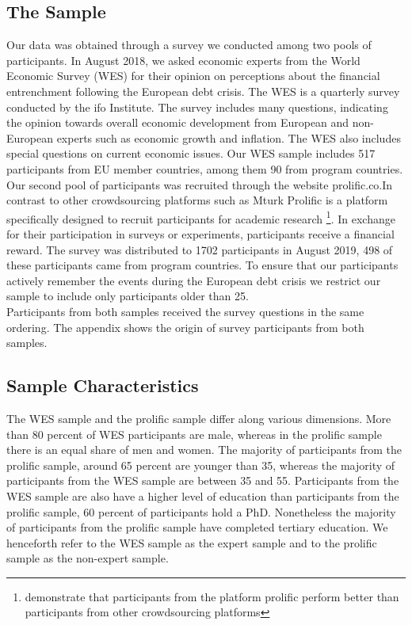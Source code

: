 \documentclass[12pt]{article}
\begin{document}
\subsection{The Sample}
Our data was obtained through a survey we conducted among two pools of participants. In August 2018, we asked economic experts from the World Economic Survey (WES) for their opinion on perceptions about the financial entrenchment following the European debt crisis. The WES is a quarterly survey conducted by the ifo Institute. The survey includes many  questions, indicating the opinion towards overall economic development from European and non-European  experts such as economic growth and inflation. The WES also includes special questions on current economic issues. Our WES sample includes 517 participants from EU member countries, among them 90 from program countries.
\\
Our second pool of participants was recruited through the website prolific.co.In contrast to other crowdsourcing platforms such as Mturk Prolific is a platform specifically designed to recruit participants for academic research \footnote{\cite{Peer} demonstrate that participants from the platform prolific perform better than participants from other crowdsourcing platforms}. In exchange for their participation in surveys or experiments, participants receive a financial reward. The survey was distributed to 1702 participants in August 2019, 498 of these participants came from program countries. To ensure that our participants actively remember the events during the European debt crisis we restrict our sample to include only participants older than 25. \\
Participants from both samples received the survey questions in the same ordering. The appendix shows the origin of survey participants from both samples.  
\subsection{Sample Characteristics} 
The WES sample and the prolific sample differ along various dimensions. More than 80 percent of WES participants are male, whereas in the prolific sample there is an equal share of men and women. The majority of participants from the prolific sample, around 65 percent are younger than 35, whereas the majority of participants from the WES sample are between 35 and 55. Participants from the WES sample are also have a higher level of education than participants from the prolific sample, 60 percent of participants hold a PhD. Nonetheless the majority of participants from the prolific sample have completed tertiary education. We henceforth refer to the WES sample as the expert sample and to the prolific sample as the non-expert sample. 
\end{document}
